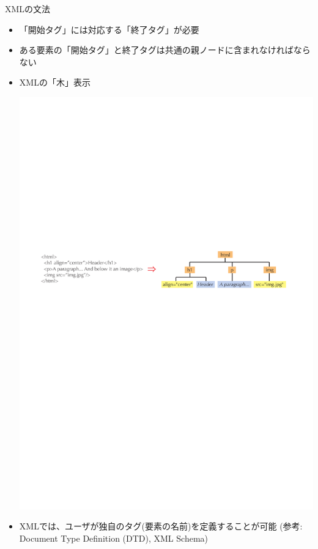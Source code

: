\begin{frame}{XMLの文法}
  \begin{itemize}
  \item 「開始タグ」には対応する「終了タグ」が必要
  \item ある要素の「開始タグ」と終了タグは共通の親ノードに含まれなければならない
  \item XMLの「木」表示
  \begin{center}
    \includegraphics[width=\textwidth]{xml2.pdf}
  \end{center}
  \item XMLでは、ユーザが独自のタグ(要素の名前)を定義することが可能 (参考: Document Type Definition (DTD), XML Schema)
  \end{itemize}
\end{frame}

